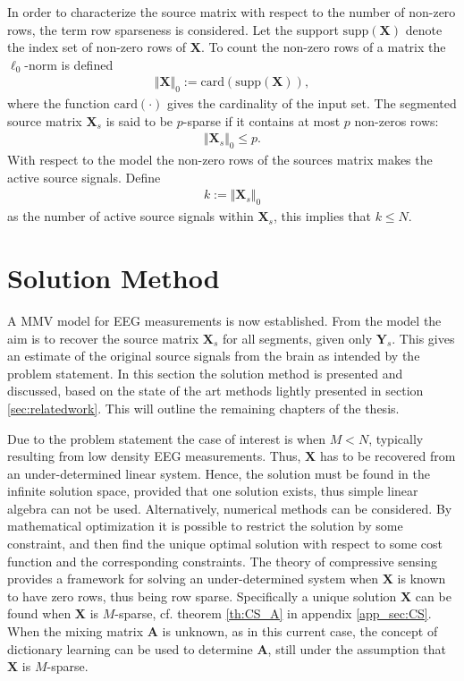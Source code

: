 In order to characterize the source matrix with respect to the number of non-zero rows, the term row sparseness is considered. 
Let the support $\text{supp}(\mathbf{X})$ denote the index set of non-zero rows of $\mathbf{X}$.
To count the non-zero rows of a matrix the $\ell_0$-norm is defined 
\begin{align*}
\Vert \mathbf{X} \Vert_0 := \text{card}(\text{supp}(\mathbf{X})),
\end{align*}
where the function $\text{card}(\cdot)$ gives the cardinality of the input set. The segmented source matrix $\textbf{X}_s$ is said to be $p$-sparse if it contains at most $p$ non-zeros rows:
\begin{align*}
\Vert \mathbf{X}_s \Vert_0 \leq p.
\end{align*}
With respect to the model the non-zero rows of the sources matrix makes the active source signals. Define  
\begin{align*}
k := \Vert \mathbf{X}_s \Vert_0
\end{align*} 
as the number of active source signals within $\textbf{X}_s$, this implies that $k\leq N$. 

\section{Solution Method}\label{sec:sol_met}
A MMV model for EEG measurements is now established.
From the model the aim is to recover the source matrix $\mathbf{X}_s$ for all segments, given only $\textbf{Y}_s$.
This gives an estimate of the original source signals from the brain as intended by the problem statement. 
In this section the solution method is presented and discussed, based on the state of the art methods lightly presented in section \ref{sec:relatedwork}. This will outline the remaining chapters of the thesis. 

Due to the problem statement the case of interest is when $M < N$, typically resulting from low density EEG measurements.  
Thus, $\mathbf{X}$ has to be recovered from an under-determined linear system. 
Hence, the solution must be found in the infinite solution space, provided that one solution exists, thus simple linear algebra can not be used. 
Alternatively, numerical methods can be considered. By mathematical optimization it is possible to restrict the solution by some constraint, and then find the unique optimal solution with respect to some cost function and the corresponding constraints.
The theory of compressive sensing provides a framework for solving an under-determined system when $\mathbf{X}$ is known to have zero rows, thus being row sparse. 
Specifically a unique solution $\mathbf{X}$ can be found when $\mathbf{X}$ is $M$-sparse, cf. theorem \ref{th:CS_A} in appendix \ref{app_sec:CS}. 
When the mixing matrix $\mathbf{A}$ is unknown, as in this current case, the concept of dictionary learning can be used to determine $\mathbf{A}$, still under the assumption that $\mathbf{X}$ is $M$-sparse.  

